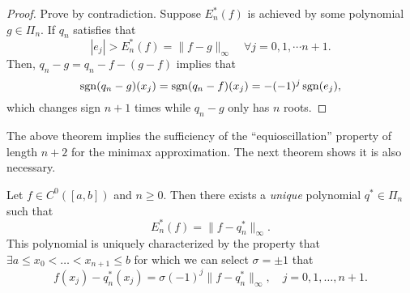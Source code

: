 \begin{proof}
    Prove by contradiction. Suppose $E_n^{\ast}(f)$ is achieved by some polynomial $g\in\Pi_n$. If $q_n$ satisfies that 
    \begin{equation}
        |e_j| > E_n^{\ast}(f) = \|f - g\|_{\infty} \quad \forall j=0,1,\cdots n+1.
    \end{equation}
    Then, $q_n - g = q_n - f - (g - f)$ implies that 
    \begin{equation}
    \operatorname{sgn}(q_n - g)(x_j) = \operatorname{sgn}(q_n - f)(x_j) = -(-1)^j\operatorname{sgn}(e_j),
    \end{equation}
    which changes sign $n+1$ times while $q_n - g$ only has $n$ roots.
\end{proof}
The above theorem implies the sufficiency of the ``equioscillation'' property of length $n+2$ for the minimax approximation. The next theorem shows it is also necessary.
\begin{theorem}
\label{Thm: 4-Che-Equ}
    Let $f\in C^0([a, b])$ and $n\ge 0$. Then there exists a \emph{unique} polynomial $q^{\ast}\in\Pi_n$ such that 
    \begin{equation}
        E_{n}^{\ast}(f) = \|f - q_n^{\ast}\|_{\infty}.
    \end{equation}
    This polynomial is uniquely characterized by the property that 
    $\exists a\le x_0<\dots < x_{n+1}\le b$ 
    for which we can select $\sigma = \pm 1$ that 
    \begin{equation}\label{EQ: 4-EQUI-OSCI}
        f(x_j) - q_n^{\ast}(x_j) = \sigma (-1)^j \|f - q_n^{\ast}\|_{\infty} ,\quad j=0,1,\dots, n+1.
    \end{equation}
\end{theorem}
